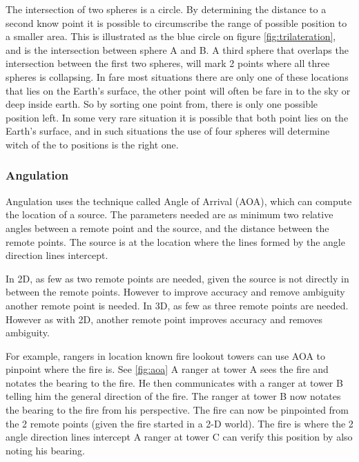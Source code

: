   The intersection of two spheres is a circle. By determining the distance to a second know point it is possible to circumscribe the range of possible position to a smaller area.
  This is illustrated as the blue circle on figure \ref{fig:trilateration}, and is the intersection between sphere A and B.
  A third sphere that overlaps the intersection between the first two spheres, will mark 2 points where all three spheres is collapsing. In fare most situations there are only one of these locations that lies on the Earth's surface, the other point will often be fare in to the sky or deep inside earth. So by sorting one point from, there is only one possible position left. 
  In some very rare situation it is possible that both point lies on the Earth's surface, and in such situations the use of four spheres will determine witch of the to positions is the right one.



  \subsubsection{Angulation}

  Angulation uses the technique called Angle of Arrival (AOA), which can compute the location of a source. The parameters needed are as minimum two relative angles between a remote point and the source, and the distance between the remote points. The source is at the location where the lines formed by the angle direction lines intercept. 

  In 2D, as few as two remote points are needed, given the source is not directly in between the remote points. However to improve accuracy and remove ambiguity  another remote point is needed. In 3D, as few as three remote points are needed. However as with 2D, another remote point improves accuracy and removes ambiguity. \cite{Liu2007, Sun2009, Boontrai2009}

  For example, rangers in location known fire lookout towers can use AOA to pinpoint where the fire is. See \cref{fig:aoa} A ranger at tower A sees the fire and notates the bearing to the fire. He then communicates with a ranger at tower B telling him the general direction of the fire. The ranger at tower B now notates the bearing to the fire from his perspective. The fire can now be pinpointed from the 2 remote points (given the fire started in a 2-D world). The fire is where the 2 angle direction lines intercept A ranger at tower C can verify this position by also noting his bearing. \cite{compassdude_triangulation}


